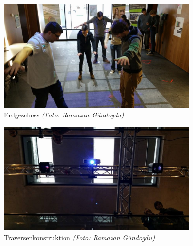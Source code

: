 \begin{figure}[htbp]
	\centering
		\includegraphics[width=0.9\textwidth]{images/TdM2.jpg}
	\caption{Erdgeschoss \textit{(Foto: Ramazan Gündogdu)}}
	\label{fig:TdM2}
\end{figure}

\begin{figure}[htbp]
	\centering
		\includegraphics[width=0.9\textwidth]{images/TdM3.jpg}
	\caption{Traversenkonstruktion \textit{(Foto: Ramazan Gündogdu)}}
	\label{fig:TdM3}
\end{figure}

